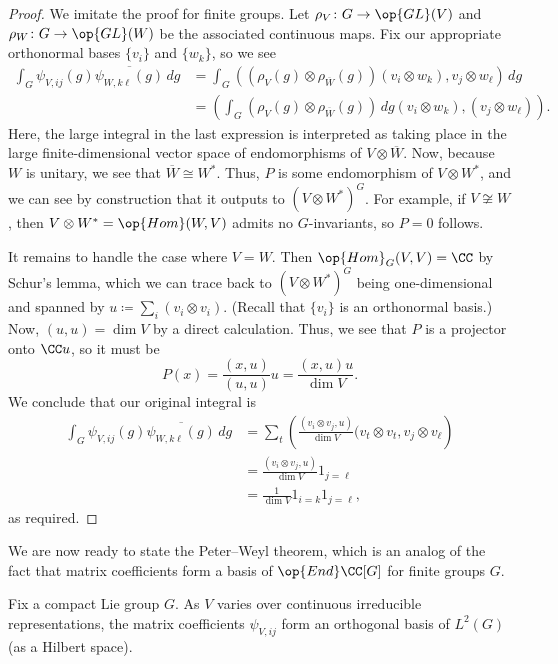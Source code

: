 \documentclass[../notes.tex]{subfiles}
\begin{document}
\begin{proof}
	We imitate the proof for finite groups. Let $\rho_V\colon G\to\op{GL}(V)$ and $\rho_W\colon G\to\op{GL}(W)$ be the associated continuous maps. Fix our appropriate orthonormal bases $\{v_i\}$ and $\{w_k\}$, so we see
	\begin{align*}
		\int_G\psi_{V,ij}(g)\overline{\psi_{W,k\ell}(g)}\,dg &= \int_G((\rho_V(g)\otimes\rho_{\overline W}(g))(v_i\otimes w_k),v_j\otimes w_\ell)\,dg \\
		&= \left(\int_G(\rho_V(g)\otimes\rho_{\overline W}(g))\,dg(v_i\otimes w_k),(v_j\otimes w_\ell)\right).
	\end{align*}
	Here, the large integral in the last expression is interpreted as taking place in the large finite-dimensional vector space of endomorphisms of $V\otimes\overline W$. Now, because $W$ is unitary, we see that $\overline W\cong W^*$. Thus, $P$ is some endomorphism of $V\otimes W^*$, and we can see by construction that it outputs to $(V\otimes W^*)^G$. For example, if $V\not\cong W$, then $V\otimes W^*=\op{Hom}(W,V)$ admits no $G$-invariants, so $P=0$ follows.

	It remains to handle the case where $V=W$. Then $\op{Hom}_G(V,V)=\CC$ by Schur's lemma, which we can trace back to $(V\otimes W^*)^G$ being one-dimensional and spanned by $u\coloneqq\sum_i(v_i\otimes v_i)$. (Recall that $\{v_i\}$ is an orthonormal basis.) Now, $(u,u)=\dim V$ by a direct calculation. Thus, we see that $P$ is a projector onto $\CC u$, so it must be
	\[P(x)=\frac{(x,u)}{(u,u)}u=\frac{(x,u)u}{\dim V}.\]
	We conclude that our original integral is
	\begin{align*}
		\int_G\psi_{V,ij}(g)\overline{\psi_{W,k\ell}(g)}\,dg &= \sum_t\left(\frac{(v_i\otimes v_j,u)}{\dim V}(v_t\otimes v_t,v_j\otimes v_\ell\right) \\
		&= \frac{(v_i\otimes v_j,u)}{\dim V}1_{j=\ell} \\
		&= \frac1{\dim V}1_{i=k}1_{j=\ell},
	\end{align*}
	as required.
\end{proof}
We are now ready to state the Peter--Weyl theorem, which is an analog of the fact that matrix coefficients form a basis of $\op{End}\CC[G]$ for finite groups $G$.
\begin{theorem} \label{thm:peter-weyl}
	Fix a compact Lie group $G$. As $V$ varies over continuous irreducible representations, the matrix coefficients $\psi_{V,ij}$ form an orthogonal basis of $L^2(G)$ (as a Hilbert space).
\end{theorem}
\end{document}
